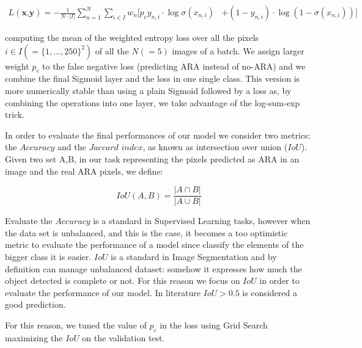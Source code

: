\documentclass[9pt,conference,compsocconf]{IEEEtran}
\begin{document}
\begin{multline}
    L(\textbf{x,y}) = - \frac{1}{N \cdot |I|} \sum_{n=1}^{N} \sum_{i  \in I} w_n [ p_c y_{n,i} \cdot \log \sigma(x_{n,i}) & + (1 - y_{n,i}) \cdot \log (1 - \sigma(x_{n,i})) ]
\end{multline}

computing the mean of the weighted entropy loss over all the pixels $i \in I (= \{1,..., 250\}^2)$ of all the $N(=5)$ images of a batch. We assign larger weight $p_c$ to the false negative loss (predicting ARA instead of no-ARA) and we combine the final Sigmoid layer and the loss in one single class. This version is more numerically stable \cite{BCEWITHLOGITSLOSS:2019} than using a plain Sigmoid followed by a loss as, by combining the operations into one layer, we take advantage of the log-sum-exp trick.

In order to evaluate the final performances of our model we consider two metrics: the $Accuracy$ and  the $Jaccard$ $index$, as known as intersection over union ($IoU$). Given two set A,B, in our task representing the pixels predicted as ARA in an image and the real ARA pixels, we define:

$$
IoU(A,B)=\frac{|A \cap B|}{|A \cup B|}
$$


Evaluate the $Accuracy$ is a standard in Supervised Learning tasks, however when the data set is unbalanced, and this is the case, it becomes a too optimistic metric to evaluate the performance of a model since classify the elements of the bigger class it is easier. $IoU$ is a standard in Image Segmentation and by definition can manage unbalanced dataset: somehow it expresses how much the object detected is complete or not. For this reason we focus on $IoU$ in order to evaluate the performance of our model. In literature $IoU>0.5$ is considered a good prediction. 

For this reason, we tuned the value of $p_c$ in the loss using Grid Search maximizing the $IoU$ on the validation test.
\end{document}
